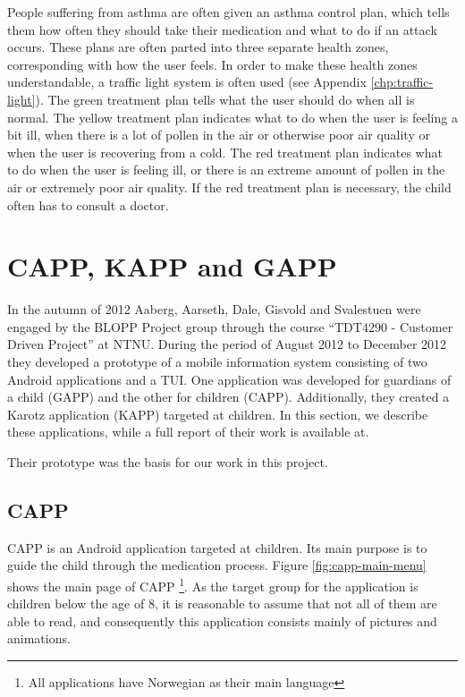 People suffering from asthma are often given an asthma control plan, which tells them how often they should take their medication and what to do if an attack occurs. These plans are often parted into three separate health zones, corresponding with how the user feels. In order to make these health zones understandable, a traffic light system is often used (see Appendix \ref{chp:traffic-light}). The green treatment plan tells what the user should do when all is normal. The yellow treatment plan indicates what to do when the user is feeling a bit ill, when there is a lot of pollen in the air or otherwise poor air quality or when the user is recovering from a cold. The red treatment plan indicates what to do when the user is feeling ill, or there is an extreme amount of pollen in the air or extremely poor air quality. If the red treatment plan is necessary, the child often has to consult a doctor. 


\section{CAPP, KAPP and GAPP}
\label{sec:cappgappkapp}
In the autumn of 2012 Aaberg, Aarseth, Dale, Gisvold and Svalestuen were engaged by the BLOPP Project group through the course ``TDT4290 - Customer Driven Project'' at NTNU. During the period of August 2012 to December 2012 they developed a prototype of a mobile information system consisting of two Android applications and a TUI. One application was developed for guardians of a child (GAPP) and the other for children (CAPP). Additionally, they created a Karotz application (KAPP) targeted at children. In this section, we describe these applications, while a full report of their work is available at\cite{CustomerDriven}. 

Their prototype was the basis for our work in this project. 


\subsection{CAPP}
\label{sec:description-capp}
CAPP is an Android application targeted at children. Its main purpose is to guide the child through the medication process. Figure \ref{fig:capp-main-menu} shows the main page of CAPP \footnote{All applications have Norwegian as their main language}.  
As the target group for the application is children below the age of 8, it is reasonable to assume that not all of them are able to read, and consequently this application consists mainly of pictures and animations.


